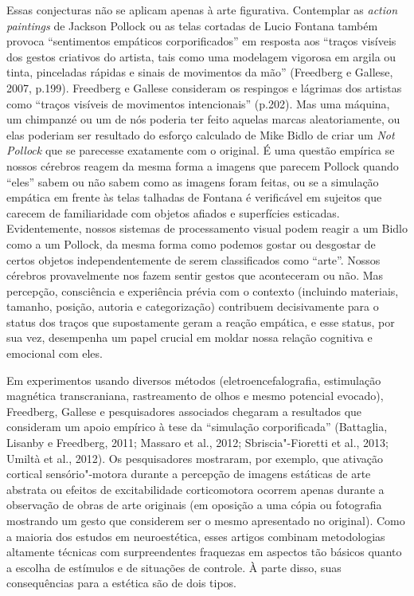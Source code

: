 Essas conjecturas não se aplicam apenas à arte figurativa. Contemplar as
\emph{action paintings} de Jackson Pollock ou as telas cortadas de Lucio
Fontana também provoca ``sentimentos empáticos corporificados'' em
resposta aos ``traços visíveis dos gestos criativos do artista, tais
como uma modelagem vigorosa em argila ou tinta, pinceladas rápidas e
sinais de movimentos da mão'' (Freedberg e Gallese, 2007, p.199).
Freedberg e Gallese consideram os respingos e lágrimas dos artistas como
``traços visíveis de movimentos intencionais'' (p.202). Mas uma máquina,
um chimpanzé ou um de nós poderia ter feito aquelas marcas
aleatoriamente, ou elas poderiam ser resultado do esforço calculado de
Mike Bidlo de criar um \emph{Not Pollock} que se parecesse exatamente
com o original. É uma questão empírica se nossos cérebros reagem da
mesma forma a imagens que parecem Pollock quando ``eles'' sabem ou não
sabem como as imagens foram feitas, ou se a simulação empática em frente
às telas talhadas de Fontana é verificável em sujeitos que carecem de
familiaridade com objetos afiados e superfícies esticadas.
Evidentemente, nossos sistemas de processamento visual podem reagir a um
Bidlo como a um Pollock, da mesma forma como podemos gostar ou desgostar
de certos objetos independentemente de serem classificados como
``arte''. Nossos cérebros provavelmente nos fazem sentir gestos que
aconteceram ou não. Mas percepção, consciência e experiência prévia com
o contexto (incluindo materiais, tamanho, posição, autoria e
categorização) contribuem decisivamente para o status dos traços que
supostamente geram a reação empática, e esse status, por sua vez,
desempenha um papel crucial em moldar nossa relação cognitiva e
emocional com eles.

Em experimentos usando diversos métodos (eletroencefalografia,
estimulação magnética transcraniana, rastreamento de olhos e mesmo
potencial evocado), Freedberg, Gallese e pesquisadores associados
chegaram a resultados que consideram um apoio empírico à tese da
``simulação corporificada'' (Battaglia, Lisanby e Freedberg, 2011;
Massaro et al., 2012; Sbriscia"-Fioretti et al., 2013; Umiltà et al.,
2012). Os pesquisadores mostraram, por exemplo, que ativação cortical
sensório"-motora durante a percepção de imagens estáticas de arte
abstrata ou efeitos de excitabilidade corticomotora ocorrem apenas
durante a observação de obras de arte originais (em oposição a uma cópia
ou fotografia mostrando um gesto que considerem ser o mesmo apresentado
no original). Como a maioria dos estudos em neuroestética, esses artigos
combinam metodologias altamente técnicas com surpreendentes fraquezas em
aspectos tão básicos quanto a escolha de estímulos e de situações de
controle. À parte disso, suas consequências para a estética são de dois
tipos.

